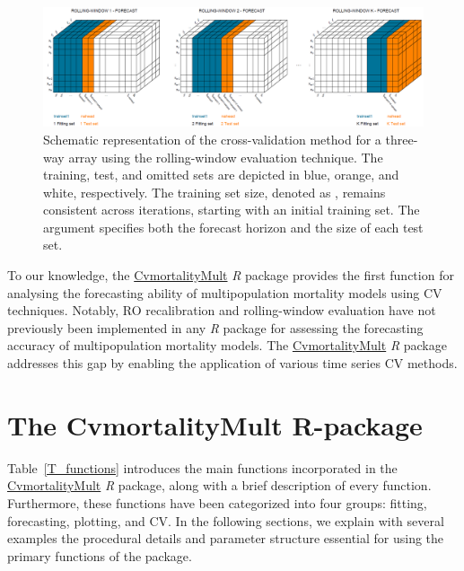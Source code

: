 \begin{figure}[h!]
\centering
\includegraphics*[width=\textwidth]{RW_RECALIBRATION.png}
\caption{Schematic representation of the cross-validation method for a three-way array using the rolling-window evaluation technique. The training, test, and omitted sets are depicted in blue, orange, and white, respectively. The training set size, denoted as , remains consistent across iterations, starting with an initial training set. The argument  specifies both the forecast horizon and the size of each test set. }
\label{fig3}
\end{figure}

To our knowledge, the \href{https://cran.r-project.org/web/packages/CvmortalityMult/index.html}{CvmortalityMult} \emph{R} package provides the first function for analysing the forecasting ability of multipopulation mortality models using CV techniques. Notably, RO recalibration and rolling-window evaluation have not previously been implemented in any \emph{R} package for assessing the forecasting accuracy of multipopulation mortality models. The \href{https://cran.r-project.org/web/packages/CvmortalityMult/index.html}{CvmortalityMult} \emph{R} package addresses this gap by enabling the application of various time series CV methods.

\section{The CvmortalityMult R-package} \label{sec:description of CvmortalityMult}

Table~\ref{T_functions} introduces the main functions incorporated in the \href{https://cran.r-project.org/web/packages/CvmortalityMult/index.html}{CvmortalityMult} \emph{R} package, along with a brief description of every function. Furthermore, these functions have been categorized into four groups: fitting, forecasting, plotting, and CV. In the following sections, we explain with several examples the procedural details and parameter structure essential for using the primary functions of the package.

